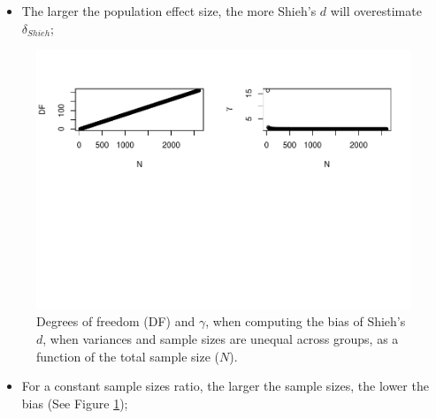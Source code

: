\documentclass[
  english,
  man,mask]{apa6}
\providecommand{\tightlist}{%
  \setlength{\itemsep}{0pt}\setlength{\parskip}{0pt}}
\begin{document}
\begin{itemize}
\tightlist
\item
  The larger the population effect size, the more Shieh's \(d\) will overestimate \(\delta_{Shieh}\);
\end{itemize}

\begin{figure}
\centering
\includegraphics{Theoretical-Bias-of-all-estimators-as-a-function-of-population-parameters_files/figure-latex/biasshiehhetunbalNsize2-1.pdf}
\caption{\label{fig:biasshiehhetunbalNsize2}Degrees of freedom (DF) and \(\gamma\), when computing the bias of Shieh's \(d\), when variances and sample sizes are unequal across groups, as a function of the total sample size (\(N\)).}
\end{figure}

\begin{itemize}
\tightlist
\item
  For a constant sample sizes ratio, the larger the sample sizes, the lower the bias (See Figure \ref{fig:biasshiehhetunbalNsize2});
\end{itemize}
\end{document}
